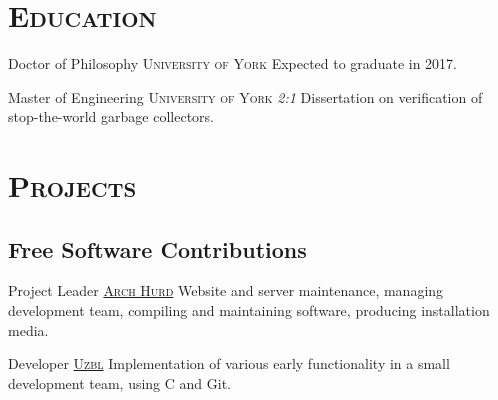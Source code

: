 \documentclass[a4paper,11pt]{moderncv}
\newcommand{\schref}[2]{\href{#1}{\textsc{#2}}}
\newcommand{\when}[1]{\multirow{2}{2cm}{\raggedleft \textsc{#1}} &}
\newcommand{\detail}[1]{ & \footnotesize{#1}}
\begin{document}
\section{\scshape Education}

  {Doctor of Philosophy}
  {\scshape University of York}
  {}
  {}
  {Expected to graduate in 2017.}

  {Master of Engineering}
  {\scshape University of York}
  {}
  {\textit{2:1}}
  {Dissertation on verification of stop-the-world garbage collectors.}



\section{\scshape Projects}

\subsection{Free Software Contributions}

  {Project Leader}
  {\schref{http://www.archhurd.org}{Arch Hurd}}
  {}
  {}
  {Website and server maintenance, managing development team, compiling and maintaining software, producing installation media.}



  {Developer}
  {\schref{http://www.uzbl.org}{Uzbl}}
  {}
  {}
  {Implementation of various early functionality in a small development team, using C and Git.}
\end{document}
